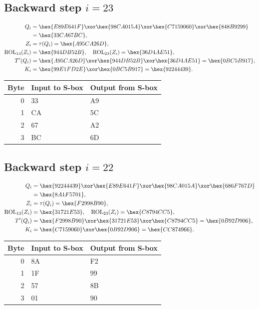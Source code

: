 \subsection*{Backward step $i=23$}
\begin{align*}
Q_i&=\hex{E89E641F}\xor\hex{98CA015A}\xor\hex{C7159060}\xor\hex{848B9299}\\&=\hex{33CA67BC},\\
Z_i&=\tau(Q_i)=\hex{A95CA26D},\\
\operatorname{ROL}_{13}(Z_i)&=\hex{944DB52B},\quad\operatorname{ROL}_{23}(Z_i)=\hex{36D4AE51},\\
T'(Q_i)&=\hex{A95CA26D}\xor\hex{944DB52B}\xor\hex{36D4AE51}=\hex{0BC5B917},\\
K_i&=\hex{99E1FD2E}\xor\hex{0BC5B917}=\hex{92244439}.\end{align*}
\begingroup\small
\begin{longtable}{rll}
\toprule
Byte & Input to S-box & Output from S-box\\\midrule
\endhead
0 & 33 & A9\\
1 & CA & 5C\\
2 & 67 & A2\\
3 & BC & 6D\\
\bottomrule\end{longtable}
\endgroup
\subsection*{Backward step $i=22$}
\begin{align*}
Q_i&=\hex{92244439}\xor\hex{E89E641F}\xor\hex{98CA015A}\xor\hex{686F767D}\\&=\hex{8A1F5701},\\
Z_i&=\tau(Q_i)=\hex{F2998B90},\\
\operatorname{ROL}_{13}(Z_i)&=\hex{31721E53},\quad\operatorname{ROL}_{23}(Z_i)=\hex{C8794CC5},\\
T'(Q_i)&=\hex{F2998B90}\xor\hex{31721E53}\xor\hex{C8794CC5}=\hex{0B92D906},\\
K_i&=\hex{C7159060}\xor\hex{0B92D906}=\hex{CC874966}.\end{align*}
\begingroup\small
\begin{longtable}{rll}
\toprule
Byte & Input to S-box & Output from S-box\\\midrule
\endhead
0 & 8A & F2\\
1 & 1F & 99\\
2 & 57 & 8B\\
3 & 01 & 90\\
\bottomrule\end{longtable}
\endgroup
